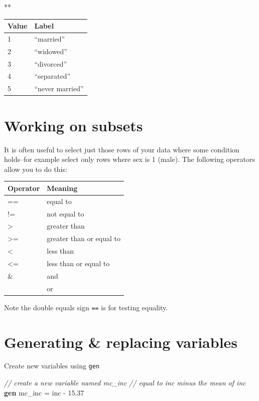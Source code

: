 \documentclass[
]{book}
\newenvironment{Shaded}{\begin{snugshade}}{\end{snugshade}}
\newcommand{\CommentTok}[1]{\textcolor[rgb]{0.56,0.35,0.01}{\textit{#1}}}
\newcommand{\KeywordTok}[1]{\textcolor[rgb]{0.13,0.29,0.53}{\textbf{#1}}}
\newcommand{\NormalTok}[1]{#1}
\begin{document}
\begin{Shaded}
\begin{Highlighting}[]
\NormalTok{**}
\end{Highlighting}
\end{Shaded}

\begin{longtable}[]{@{}ll@{}}
\toprule
Value & Label\tabularnewline
\midrule
\endhead
1 & ``married''\tabularnewline
2 & ``widowed''\tabularnewline
3 & ``divorced''\tabularnewline
4 & ``separated''\tabularnewline
5 & ``never married''\tabularnewline
\bottomrule
\end{longtable}

\hypertarget{working-on-subsets}{%
\section{Working on subsets}\label{working-on-subsets}}

It is often useful to select just those rows of your data where some condition holds--for example select only rows where sex is 1 (male).
The following operators allow you to do this:

\begin{longtable}[]{@{}ll@{}}
\toprule
Operator & Meaning\tabularnewline
\midrule
\endhead
== & equal to\tabularnewline
!= & not equal to\tabularnewline
\textgreater{} & greater than\tabularnewline
\textgreater= & greater than or equal to\tabularnewline
\textless{} & less than\tabularnewline
\textless= & less than or equal to\tabularnewline
\& & and\tabularnewline
\textbar{} & or\tabularnewline
\bottomrule
\end{longtable}

Note the double equals sign \texttt{==} is for testing equality.

\hypertarget{generating-replacing-variables}{%
\section{Generating \& replacing variables}\label{generating-replacing-variables}}

Create new variables using \texttt{gen}

\begin{Shaded}
\begin{Highlighting}[]
  \CommentTok{// create a new variable named mc_inc}
  \CommentTok{//   equal to inc minus the mean of inc}
  \KeywordTok{gen}\NormalTok{ mc_inc = inc - 15.37  }
\end{Highlighting}
\end{Shaded}
\end{document}
